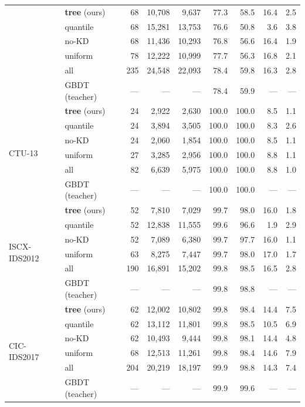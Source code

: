 \begin{table}[!ht]
{\begin{tabular}{l l r r r r r r r}
& \textbf{tree} (ours) & 68 & 10,708 & 9,637 & 77.3 & 58.5 & 16.4 & 2.5 \\
& quantile & 68 & 15,281 & 13,753 & 76.6 & 50.8 & 3.6 & 3.8 \\
& no-KD & 68 & 11,436 & 10,293 & 76.8 & 56.6 & 16.4 & 1.9 \\
& uniform & 78 & 12,222 & 10,999 & 77.7 & 56.3 & 16.8 & 2.1 \\
& all & 235 & 24,548 & 22,093 & 78.4 & 59.8 & 16.3 & 2.8 \\
& GBDT (teacher) & --- & --- & --- & 78.4 & 59.9 & --- & --- \\
\midrule
\multirow{6}{*}{CTU-13}
& \textbf{tree} (ours) & 24 & 2,922 & 2,630 & 100.0 & 100.0 & 8.5 & 1.1 \\
& quantile & 24 & 3,894 & 3,505 & 100.0 & 100.0 & 8.3 & 2.6 \\
& no-KD & 24 & 2,060 & 1,854 & 100.0 & 100.0 & 8.5 & 1.1 \\
& uniform & 27 & 3,285 & 2,956 & 100.0 & 100.0 & 8.8 & 1.1 \\
& all & 82 & 6,639 & 5,975 & 100.0 & 100.0 & 8.8 & 1.0 \\
& GBDT (teacher) & --- & --- & --- & 100.0 & 100.0 & --- & --- \\
\midrule
\multirow{6}{*}{ISCX-IDS2012}
& \textbf{tree} (ours) & 52 & 7,810 & 7,029 & 99.7 & 98.0 & 16.0 & 1.8 \\
& quantile & 52 & 12,838 & 11,555 & 99.6 & 96.6 & 1.9 & 2.9 \\
& no-KD & 52 & 7,089 & 6,380 & 99.7 & 97.7 & 16.0 & 1.1 \\
& uniform & 63 & 8,275 & 7,447 & 99.7 & 98.0 & 17.0 & 1.7 \\
& all & 190 & 16,891 & 15,202 & 99.8 & 98.5 & 16.5 & 2.8 \\
& GBDT (teacher) & --- & --- & --- & 99.8 & 98.8 & --- & --- \\
\midrule
\multirow{6}{*}{CIC-IDS2017}
& \textbf{tree} (ours) & 62 & 12,002 & 10,802 & 99.8 & 98.4 & 14.4 & 7.5 \\
& quantile & 62 & 13,112 & 11,801 & 99.8 & 98.5 & 10.5 & 6.9 \\
& no-KD & 62 & 10,493 & 9,444 & 99.8 & 98.1 & 14.4 & 4.8 \\
& uniform & 68 & 12,513 & 11,261 & 99.8 & 98.4 & 14.6 & 7.9 \\
& all & 204 & 20,219 & 18,197 & 99.9 & 98.8 & 14.3 & 7.4 \\
& GBDT (teacher) & --- & --- & --- & 99.9 & 99.6 & --- & --- \\

\end{tabular}}
\end{table}
